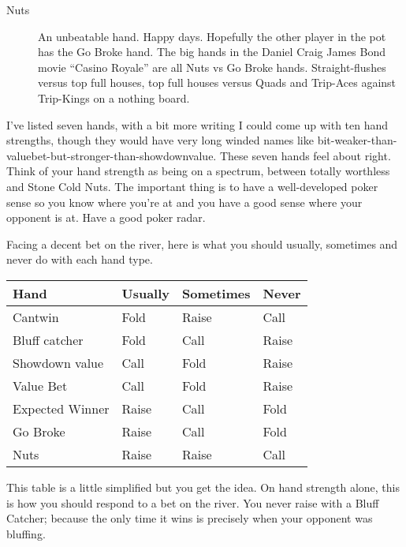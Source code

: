 \begin{description}
\item[Nuts] An unbeatable hand. Happy days. Hopefully the other player
in the pot has the Go Broke hand. The big hands in the Daniel Craig
James Bond movie ``Casino Royale'' are all Nuts vs Go Broke hands.
Straight-flushes versus top full houses, top full houses versus
Quads and Trip-Aces against Trip-Kings on a nothing board.

\end{description}


I've listed seven hands, with a bit more writing
I could come up with ten hand strengths, though they would have
very long winded names like
bit-weaker-than-valuebet-but-stronger-than-showdownvalue. These
seven hands feel about right. Think of
your hand strength as being on a spectrum, between totally
worthless and Stone Cold Nuts. The important thing is to have
a well-developed poker sense so you know where you're at and you
have a good sense where your opponent is at. Have a good poker radar.

Facing a decent bet on the river, here is what you should
usually, sometimes and never do with each hand type.

\begin{tabular}{|l|l|l|l|} \hline
Hand             & Usually & Sometimes & Never \\ \hline
Cantwin          & Fold    & Raise     & Call  \\ \hline
Bluff catcher    & Fold    & Call      & Raise \\ \hline
Showdown value   & Call    & Fold      & Raise \\ \hline
Value Bet        & Call    & Fold      & Raise \\ \hline
Expected Winner  & Raise   & Call      & Fold  \\ \hline
Go Broke         & Raise   & Call      & Fold  \\ \hline
Nuts             & Raise   & Raise     & Call  \\ \hline
\end{tabular}

This table is a little simplified but you get the idea. On hand strength
alone, this is how you should respond to a bet on the river. You never
raise with a Bluff Catcher; because the only time it wins is precisely
when your opponent was bluffing.
